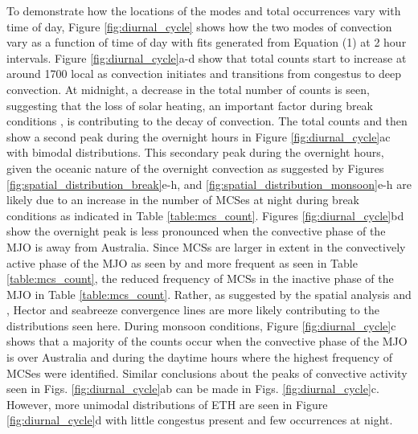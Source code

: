 \documentclass[journal abbreviation, manuscript]{copernicus}
\begin{document}
    To demonstrate how the locations of the modes and total occurrences vary with time of day, Figure \ref{fig:diurnal_cycle} shows how the two modes of convection vary as a function of time of day with fits generated from Equation (1) at 2 hour intervals. Figure \ref{fig:diurnal_cycle}a-d show that total counts start to increase at around 1700 local as convection initiates and transitions from congestus to deep convection. At midnight, a decrease in the total number of counts is seen, suggesting that the loss of solar heating, an important factor during break conditions \citep{Mayetal2012}, is contributing to the decay of convection. The total counts and then show a second peak during the overnight hours in Figure \ref{fig:diurnal_cycle}ac with bimodal distributions. This secondary peak during the overnight hours, given the oceanic nature of the overnight convection as suggested by Figures \ref{fig:spatial_distribution_break}e-h, and \ref{fig:spatial_distribution_monsoon}e-h are likely due to an increase in the number of MCSes at night during break conditions as indicated in Table \ref{table:mcs_count}. Figures \ref{fig:diurnal_cycle}bd show the overnight peak is less pronounced when the convective phase of the MJO is away from Australia. Since MCSs are larger in extent in the convectively active phase of the MJO as seen by \citep{VirtsandHouze2015} and more frequent as seen in Table \ref{table:mcs_count}, the reduced frequency of MCSs in the inactive phase of the MJO in Table \ref{table:mcs_count}. Rather, as suggested by the spatial analysis and \cite{RauniyarandWalsh2016}, Hector and seabreeze convergence lines are more likely contributing to the distributions seen here. During monsoon conditions, Figure \ref{fig:diurnal_cycle}c shows that a majority of the counts occur when the convective phase of the MJO is over Australia and during the daytime hours where the highest frequency of MCSes were identified. Similar conclusions about the peaks of convective activity seen in Figs. \ref{fig:diurnal_cycle}ab can be made in Figs. \ref{fig:diurnal_cycle}c. However, more unimodal distributions of ETH are seen in Figure \ref{fig:diurnal_cycle}d with little congestus present and few occurrences at night.
       
\conclusions  %
    
\end{document}
